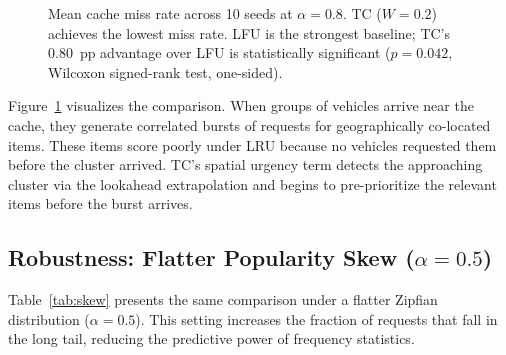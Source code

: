 \documentclass[preprint,12pt]{elsarticle}
\begin{document}
	\begin{figure}[t]
		\centering
		\caption{Mean cache miss rate across 10 seeds at $\alpha=0.8$. TC ($W=0.2$) achieves the lowest miss rate. LFU is the strongest baseline; TC's 0.80~pp advantage over LFU is statistically significant ($p=0.042$, Wilcoxon signed-rank test, one-sided).}
		\label{fig:miss_bar}
	\end{figure}
	
	Figure~\ref{fig:miss_bar} visualizes the comparison. When groups of vehicles arrive near the cache, they generate correlated bursts of requests for geographically co-located items. These items score poorly under LRU because no vehicles requested them before the cluster arrived. TC's spatial urgency term detects the approaching cluster via the lookahead extrapolation and begins to pre-prioritize the relevant items before the burst arrives.
	
	\subsection{Robustness: Flatter Popularity Skew ($\alpha = 0.5$)}
	\label{sec:skew}
	
	Table~\ref{tab:skew} presents the same comparison under a flatter Zipfian distribution ($\alpha = 0.5$). This setting increases the fraction of requests that fall in the long tail, reducing the predictive power of frequency statistics.
	
\end{document}

